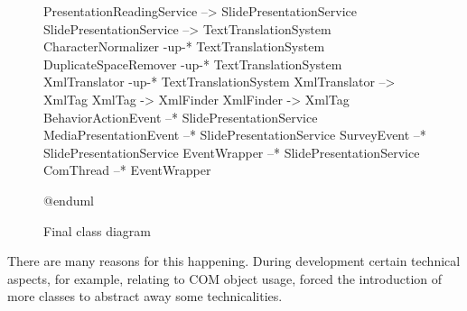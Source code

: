 \documentclass[12pt, fleqn, a4paper]{article}
\begin{document}
\begin{figure}[H]
\begin{plantuml}
PresentationReadingService --> SlidePresentationService
SlidePresentationService --> TextTranslationSystem
CharacterNormalizer -up-* TextTranslationSystem
DuplicateSpaceRemover -up-* TextTranslationSystem
XmlTranslator -up-* TextTranslationSystem
XmlTranslator --> XmlTag
XmlTag -> XmlFinder
XmlFinder -> XmlTag
BehaviorActionEvent --* SlidePresentationService
MediaPresentationEvent --* SlidePresentationService
SurveyEvent --* SlidePresentationService
EventWrapper --* SlidePresentationService
ComThread --* EventWrapper

@enduml
	\end{plantuml}
	\caption{Final class diagram}
\end{figure}
There are many reasons for this happening. During development certain technical aspects, for example, relating to COM object usage, forced the introduction of more classes to abstract away some technicalities.
\end{document}
